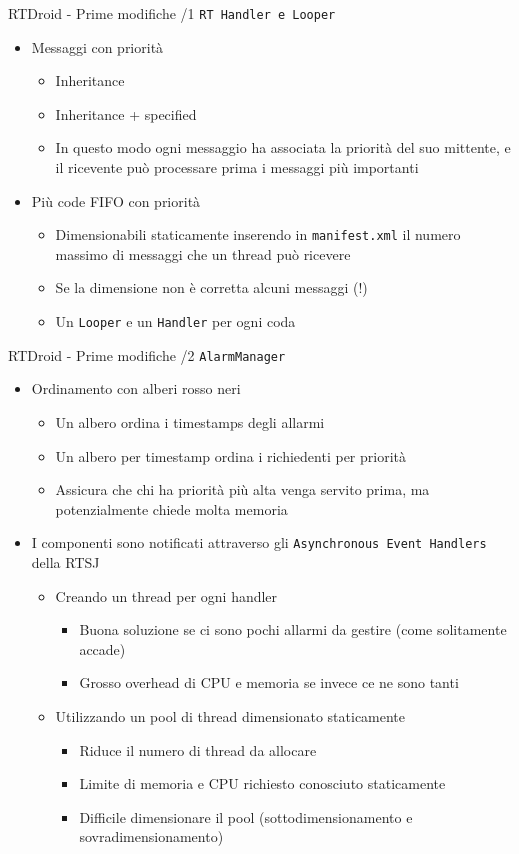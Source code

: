 \begin{frame}{RTDroid - Prime modifiche /1}
	\texttt{RT Handler e Looper}
	\begin{itemize}
		\item Messaggi con priorità
		\begin{itemize}
			\item Inheritance
			\item Inheritance + specified
			\item In questo modo ogni messaggio ha associata la priorità del suo mittente, e il ricevente può processare prima i messaggi più importanti
		\end{itemize}
		\item Più code FIFO con priorità
		\begin{itemize}
			\item Dimensionabili staticamente inserendo in \texttt{manifest.xml} il numero massimo di messaggi che un thread può ricevere
			\item Se la dimensione non è corretta alcuni messaggi (!)
			\item Un \texttt{Looper} e un \texttt{Handler} per ogni coda
		\end{itemize}
	\end{itemize}
\end{frame}
\begin{frame}{RTDroid - Prime modifiche /2}
	\texttt{AlarmManager}
	\begin{itemize}
		\item Ordinamento con alberi rosso neri
		\begin{itemize}
			\item Un albero ordina i timestamps degli allarmi
			\item Un albero per timestamp ordina i richiedenti per priorità
			\item Assicura che chi ha priorità più alta venga servito prima, ma potenzialmente chiede molta memoria
		\end{itemize}
		\item I componenti sono notificati attraverso gli \texttt{Asynchronous Event Handlers} della RTSJ
		\begin{itemize}
			\item Creando un thread per ogni handler
			\begin{itemize}
				\item Buona soluzione se ci sono pochi allarmi da gestire (come solitamente accade)
				\item Grosso overhead di CPU e memoria se invece ce ne sono tanti
			\end{itemize}
			\item Utilizzando un pool di thread dimensionato staticamente
			\begin{itemize}
				\item Riduce il numero di thread da allocare
				\item Limite di memoria e CPU richiesto conosciuto staticamente
				\item Difficile dimensionare il pool (sottodimensionamento e sovradimensionamento)
			\end{itemize}
		\end{itemize}
	\end{itemize}
\end{frame}
